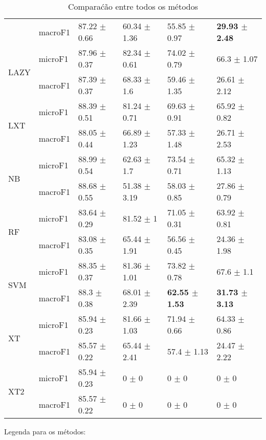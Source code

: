 \documentclass[]{article}
\begin{document}
\begin{table}[ht]
\begin{tabular}{llllll}
   & macroF1 & 87.22 $\pm$  0.66 & 60.34 $\pm$  1.36 & 55.85 $\pm$  0.97 & \bf{29.93 $\pm$  2.48} \\ 
   \cline{3-6}\multirow{2}{*}{LAZY} & microF1 & 87.96 $\pm$  0.37 & 82.34 $\pm$  0.61 & 74.02 $\pm$  0.79 & 66.3 $\pm$  1.07 \\ 
   & macroF1 & 87.39 $\pm$  0.37 & 68.33 $\pm$  1.6 & 59.46 $\pm$  1.35 & 26.61 $\pm$  2.12 \\ 
   \cline{3-6}\multirow{2}{*}{LXT} & microF1 & 88.39 $\pm$  0.51 & 81.24 $\pm$  0.71 & 69.63 $\pm$  0.91 & 65.92 $\pm$  0.82 \\ 
   & macroF1 & 88.05 $\pm$  0.44 & 66.89 $\pm$  1.23 & 57.33 $\pm$  1.48 & 26.71 $\pm$  2.53 \\ 
   \cline{3-6}\multirow{2}{*}{NB} & microF1 & 88.99 $\pm$  0.54 & 62.63 $\pm$  1.7 & 73.54 $\pm$  0.71 & 65.32 $\pm$  1.13 \\ 
   & macroF1 & 88.68 $\pm$  0.55 & 51.38 $\pm$  3.19 & 58.03 $\pm$  0.85 & 27.86 $\pm$  0.79 \\ 
   \cline{3-6}\multirow{2}{*}{RF} & microF1 & 83.64 $\pm$  0.29 & 81.52 $\pm$  1 & 71.05 $\pm$  0.31 & 63.92 $\pm$  0.81 \\ 
   & macroF1 & 83.08 $\pm$  0.35 & 65.44 $\pm$  1.91 & 56.56 $\pm$  0.45 & 24.36 $\pm$  1.98 \\ 
   \cline{3-6}\multirow{2}{*}{SVM} & microF1 & 88.35 $\pm$  0.37 & 81.36 $\pm$  1.01 & 73.82 $\pm$  0.78 & 67.6 $\pm$  1.1 \\ 
   & macroF1 & 88.3 $\pm$  0.38 & 68.01 $\pm$  2.39 & \bf{62.55 $\pm$  1.53} & \bf{31.73 $\pm$  3.13} \\ 
   \cline{3-6}\multirow{2}{*}{XT} & microF1 & 85.94 $\pm$  0.23 & 81.66 $\pm$  1.03 & 71.94 $\pm$  0.66 & 64.33 $\pm$  0.86 \\ 
   & macroF1 & 85.57 $\pm$  0.22 & 65.44 $\pm$  2.41 & 57.4 $\pm$  1.13 & 24.47 $\pm$  2.22 \\ 
   \cline{3-6}\multirow{2}{*}{XT2} & microF1 & 85.94 $\pm$  0.23 & 0 $\pm$  0 & 0 $\pm$  0 & 0 $\pm$  0 \\ 
   & macroF1 & 85.57 $\pm$  0.22 & 0 $\pm$  0 & 0 $\pm$  0 & 0 $\pm$  0 \\ 
   \cline{3-6}\end{tabular}
\caption{Comparaćão entre todos os métodos} 
\end{table}

Legenda para os métodos:
\end{document}
